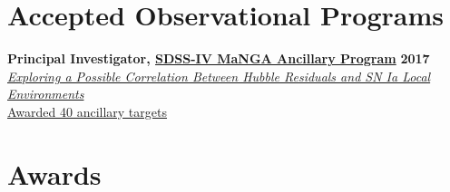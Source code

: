 \documentclass[margin]{res}
\begin{document}
\begin{resume}
\section{Accepted Observational Programs}

{\bf Principal Investigator, \href{http://www.sdss.org/dr13/manga/}{SDSS-IV MaNGA Ancillary Program}} \hfill \textbf{2017} \\
\href{https://trac.sdss.org/wiki/MANGA/Survey/AncillaryPrograms2017/Rose_SNIa_Environments_and_HR}{\textit{Exploring a Possible Correlation Between Hubble Residuals and SN Ia Local Environments}}\\
\href{http://www.sdss.org/dr14/manga/manga-target-selection/ancillary-targets/}{Awarded 40 ancillary targets}













\section{Awards} %


\end{resume}
\end{document}
